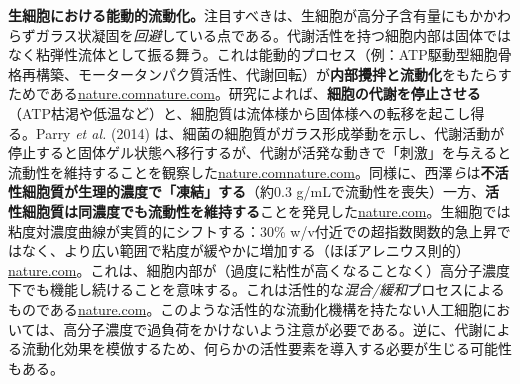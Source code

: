 \textbf{生細胞における能動的流動化。}注目すべきは、生細胞が高分子含有量にもかかわらずガラス状凝固を\textit{回避}している点である。代謝活性を持つ細胞内部は固体ではなく粘弾性流体として振る舞う。これは能動的プロセス（例：ATP駆動型細胞骨格再構築、モータータンパク質活性、代謝回転）が\textbf{内部攪拌と流動化}をもたらすためである\href{https://www.nature.com/articles/s41598-017-14883-y?error=cookies_not_supported&code=b0600d9e-c852-48ed-ab9c-7526a5c6893b\#:~:text=These\%20observations\%20indicate\%20that\%20the,is\%20typical\%20for\%20strong\%20glass}{nature.com}\href{https://www.nature.com/articles/s41598-017-14883-y?error=cookies_not_supported&code=b0600d9e-c852-48ed-ab9c-7526a5c6893b\#:~:text=of\%20living\%20cells\%20was\%20lost,can\%20be\%20attained\%20in\%20activity}{nature.com}。研究によれば、\textbf{細胞の代謝を停止させる}（ATP枯渇や低温など）と、細胞質は流体様から固体様への転移を起こし得る。Parry \textit{et al.} (2014) は、細菌の細胞質がガラス形成挙動を示し、代謝活動が停止すると固体ゲル状態へ移行するが、代謝が活発な動きで「刺激」を与えると流動性を維持することを観察した\href{https://www.nature.com/articles/s41598-017-14883-y?error=cookies_not_supported&code=b0600d9e-c852-48ed-ab9c-7526a5c6893b\#:~:text=These\%20observations\%20indicate\%20that\%20the,is\%20typical\%20for\%20strong\%20glass}{nature.com}\href{https://www.nature.com/articles/s41598-017-14883-y?error=cookies_not_supported&code=b0600d9e-c852-48ed-ab9c-7526a5c6893b\#:~:text=of\%20living\%20cells\%20was\%20lost,the\%20loss\%20of\%20fragility\%2C\%20in}{nature.com}。同様に、西澤\textit{ら}は\textbf{不活性細胞質が生理的濃度で「凍結」する}（約0.3 g/mLで流動性を喪失）一方、\textbf{活性細胞質は同濃度でも流動性を維持する}ことを発見した\href{https://www.nature.com/articles/s41598-017-14883-y?error=cookies_not_supported&code=b0600d9e-c852-48ed-ab9c-7526a5c6893b\#:~:text=cancer\%20cells,0.3\%20g\%2FmL}{nature.com}。生細胞では粘度対濃度曲線が実質的にシフトする：30\% w/v付近での超指数関数的急上昇ではなく、より広い範囲で粘度が緩やかに増加する（ほぼアレニウス則的）\href{https://www.nature.com/articles/s41598-017-14883-y?error=cookies_not_supported&code=b0600d9e-c852-48ed-ab9c-7526a5c6893b\#:~:text=of\%20living\%20cells\%20was\%20lost,the\%20loss\%20of\%20fragility\%2C\%20in}{nature.com}。これは、細胞内部が（過度に粘性が高くなることなく）高分子濃度下でも機能し続けることを意味する。これは活性的な\textit{混合/緩和}プロセスによるものである\href{https://www.nature.com/articles/s41598-017-14883-y?error=cookies_not_supported&code=b0600d9e-c852-48ed-ab9c-7526a5c6893b\#:~:text=of\%20living\%20cells\%20was\%20lost,the\%20loss\%20of\%20fragility\%2C\%20in}{nature.com}。このような活性的な流動化機構を持たない人工細胞においては、高分子濃度で過負荷をかけないよう注意が必要である。逆に、代謝による流動化効果を模倣するため、何らかの活性要素を導入する必要が生じる可能性もある。

